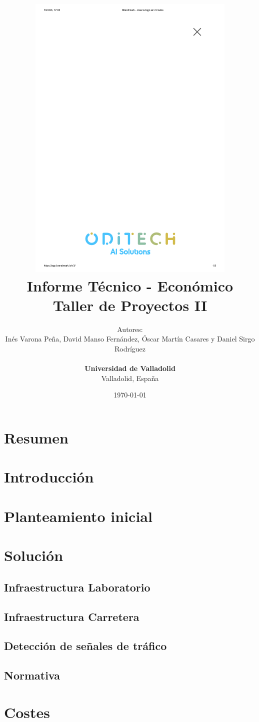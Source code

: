 \documentclass[10pt,a4paper,titlepage]{report}
\title{
\includegraphics[width=0.75\textwidth]{../OdiTech Logo.pdf}  \\
\vspace*{1in}
\textbf{Informe Técnico - Económico}\\
\vspace*{0.5in}
\textbf{Taller de Proyectos II}}
\author{Autores:\\
Inés Varona Peña, David Manso Fernández, Óscar Martín Casares y Daniel Sirgo Rodríguez\\
		\vspace*{0.5in} \\
        \textbf{Universidad de Valladolid}\\
        Valladolid, España
       } \date{\today}
\begin{document}
\maketitle

	
\tableofcontents
\listoffigures
\listoftables

\chapter{Resumen}
	
	
\chapter{Introducción}
	

\chapter{Planteamiento inicial}
	

\chapter{Solución}
	\section{Infraestructura Laboratorio}
		
	\section{Infraestructura Carretera}
		
		
	\section{Detección de señales de tráfico}
		

	\section{Normativa}	
		

\chapter{Costes}
	
\end{document}
